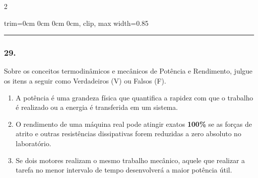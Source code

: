 \documentclass[twoside, 10pt, a4paper]{article}
\newlength{\espacoPreQuestao}\setlength{\espacoPreQuestao}{0.1cm}
\newlength{\espacoQuestao}\setlength{\espacoQuestao}{0.2cm}
\newlength{\espacoAlt}\setlength{\espacoAlt}{0.2cm}
\newcommand{\larguraTikz}{0.85\linewidth}
\begin{document}
\begin{multicols*}{2}
\begin{center}
\begin{adjustbox}{trim=0cm 0cm 0cm 0cm, clip, max width=\larguraTikz}
\end{adjustbox}
\end{center}
\par\vspace{\espacoQuestao}

\noindent\textcolor{CorLinha}{\rule{\linewidth}{0.5pt}} 
\par\vspace{\espacoPreQuestao}
\subsubsection*{29.} Sobre os conceitos termodinâmicos e mecânicos de Potência e Rendimento, julgue os itens a seguir como Verdadeiros (V) ou Falsos (F).
\begin{enumerate}[label=\Roman*., itemsep=\espacoAlt]
    \item A potência é uma grandeza física que quantifica a rapidez com que o trabalho é realizado ou a energia é transferida em um sistema.
    \item O rendimento de uma máquina real pode atingir exatos \textbf{100\%} se as forças de atrito e outras resistências dissipativas forem reduzidas a zero absoluto no laboratório.
    \item Se dois motores realizam o mesmo trabalho mecânico, aquele que realizar a tarefa no menor intervalo de tempo desenvolverá a maior potência útil.
\end{enumerate}
\par\vspace{\espacoQuestao}


\end{multicols*}
\end{document}
